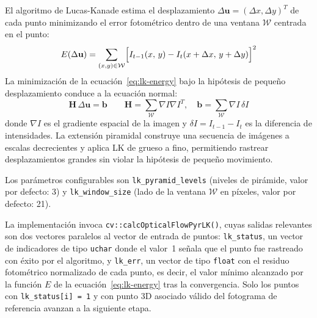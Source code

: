 El algoritmo de Lucas-Kanade \cite{Lucas1981LK} estima el desplazamiento
$\Delta\mathbf{u} = (\Delta x, \Delta y)^T$ de cada punto minimizando el
error fotométrico dentro de una ventana $\mathcal{W}$ centrada en el punto:
%
\begin{equation}
  \label{eq:lk-energy}
  E(\Delta\mathbf{u}) =
  \sum_{(x,y) \in \mathcal{W}}
  \Bigl[ I_{t-1}(x,\, y) - I_t(x + \Delta x,\, y + \Delta y) \Bigr]^2
\end{equation}
%
La minimización de la ecuación~\ref{eq:lk-energy} bajo la hipótesis de
pequeño desplazamiento conduce a la ecuación normal:
%
\begin{equation}
  \label{eq:lk-normal}
  \mathbf{H}\,\Delta\mathbf{u} = \mathbf{b}
  \qquad
  \mathbf{H} = \sum_{\mathcal{W}} \nabla I \nabla I^T, \quad
  \mathbf{b} = \sum_{\mathcal{W}} \nabla I \, \delta I
\end{equation}
%
donde $\nabla I$ es el gradiente espacial de la imagen y
$\delta I = I_{t-1} - I_t$ es la diferencia de intensidades. La extensión
piramidal \cite{Bouguet2000Pyramid} construye una secuencia de imágenes a
escalas decrecientes y aplica LK de grueso a fino, permitiendo rastrear
desplazamientos grandes sin violar la hipótesis de pequeño movimiento.

Los parámetros configurables son \texttt{lk\_pyramid\_levels} (niveles de
pirámide, valor por defecto: 3) y \texttt{lk\_window\_size} (lado de la
ventana $\mathcal{W}$ en píxeles, valor por defecto: 21).

La implementación invoca \texttt{cv::calcOpticalFlowPyrLK()}, cuyas salidas
relevantes son dos vectores paralelos al vector de entrada de puntos:
\texttt{lk\_status}, un vector de indicadores de tipo \texttt{uchar} donde
el valor~1 señala que el punto fue rastreado con éxito por el algoritmo, y
\texttt{lk\_err}, un vector de tipo \texttt{float} con el residuo fotométrico
normalizado de cada punto, es decir, el valor mínimo alcanzado por la función
$E$ de la ecuación~\ref{eq:lk-energy} tras la convergencia. Solo los puntos
con \texttt{lk\_status[i] = 1} y con punto 3D asociado válido del fotograma
de referencia avanzan a la siguiente etapa.

